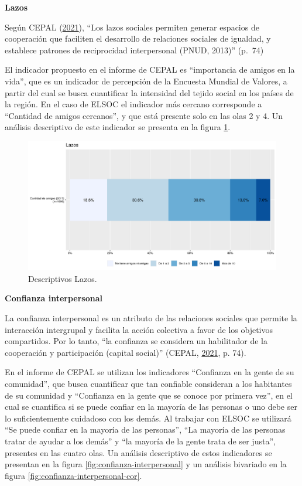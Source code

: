\documentclass[
  12pt,
]{book}
\begin{document}
\textbf{Lazos}

Según CEPAL (\protect\hyperlink{ref-cepal_Cohesion_2021}{2021}), ``Los lazos sociales permiten generar espacios de cooperación que faciliten el desarrollo de relaciones sociales de igualdad, y establece patrones de reciprocidad interpersonal (PNUD, 2013)'' (p.~74)

El indicador propuesto en el informe de CEPAL es ``importancia de amigos en la vida'', que es un indicador de percepción de la Encuesta Mundial de Valores, a partir del cual se busca cuantificar la intensidad del tejido social en los países de la región. En el caso de ELSOC el indicador más cercano corresponde a ``Cantidad de amigos cercanos'', y que está presente solo en las olas 2 y 4. Un análisis descriptivo de este indicador se presenta en la figura \ref{fig:lazos}.

\begin{figure}[H]

{\centering \includegraphics[width=1\linewidth,height=1\textheight]{output/graphs/lazos} 

}

\caption{Descriptivos Lazos.}\label{fig:lazos}
\end{figure}

\textbf{Confianza interpersonal}

La confianza interpersonal es un atributo de las relaciones sociales que permite la interacción intergrupal y facilita la acción colectiva a favor de los objetivos compartidos. Por lo tanto, ``la confianza se considera un habilitador de la cooperación y participación (capital social)'' (CEPAL, \protect\hyperlink{ref-cepal_Cohesion_2021}{2021}, p. 74).

En el informe de CEPAL se utilizan los indicadores ``Confianza en la gente de su comunidad'', que busca cuantificar que tan confiable consideran a los habitantes de su comunidad y ``Confianza en la gente que se conoce por primera vez'', en el cual se cuantifica si se puede confiar en la mayoría de las personas o uno debe ser lo suficientemente cuidadoso con los demás. Al trabajar con ELSOC se utilizará ``Se puede confiar en la mayoría de las personas'', ``La mayoría de las personas tratar de ayudar a los demás'' y ``la mayoría de la gente trata de ser justa'', presentes en las cuatro olas. Un análisis descriptivo de estos indicadores se presentan en la figura \ref{fig:confianza-interpersonal} y un análisis bivariado en la figura \ref{fig:confianza-interpersonal-cor}.
\end{document}

